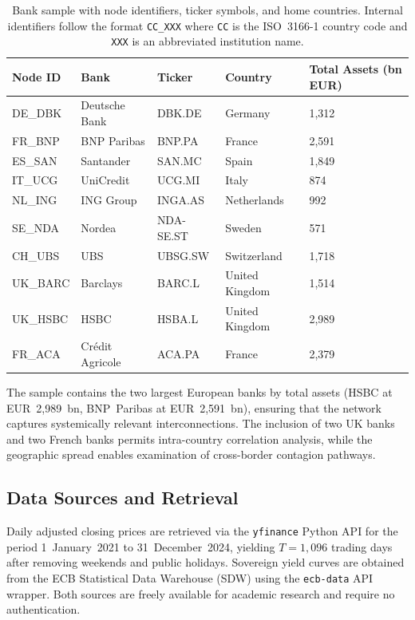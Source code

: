 \begin{table}[H]
\centering
\caption{Bank sample with node identifiers, ticker symbols, and home countries. Internal identifiers follow the format \texttt{CC\_XXX} where \texttt{CC} is the ISO~3166-1 country code and \texttt{XXX} is an abbreviated institution name.}
\label{tab:banks}
\begin{tabular}{lllll}
\toprule
\textbf{Node ID} & \textbf{Bank} & \textbf{Ticker} & \textbf{Country} & \textbf{Total Assets (bn EUR)} \\
\midrule
DE\_DBK  & Deutsche Bank      & DBK.DE    & Germany       & 1,312 \\
FR\_BNP  & BNP Paribas        & BNP.PA    & France        & 2,591 \\
ES\_SAN  & Santander          & SAN.MC    & Spain         & 1,849 \\
IT\_UCG  & UniCredit          & UCG.MI    & Italy         & 874 \\
NL\_ING  & ING Group          & INGA.AS   & Netherlands   & 992 \\
SE\_NDA  & Nordea             & NDA-SE.ST & Sweden        & 571 \\
CH\_UBS  & UBS                & UBSG.SW   & Switzerland   & 1,718 \\
UK\_BARC & Barclays           & BARC.L    & United Kingdom & 1,514 \\
UK\_HSBC & HSBC               & HSBA.L    & United Kingdom & 2,989 \\
FR\_ACA  & Cr\'{e}dit Agricole & ACA.PA   & France        & 2,379 \\
\bottomrule
\end{tabular}
\end{table}

The sample contains the two largest European banks by total assets (HSBC at EUR~2,989~bn, BNP~Paribas at EUR~2,591~bn), ensuring that the network captures systemically relevant interconnections. The inclusion of two UK banks and two French banks permits intra-country correlation analysis, while the geographic spread enables examination of cross-border contagion pathways.

\subsection{Data Sources and Retrieval}

Daily adjusted closing prices are retrieved via the \texttt{yfinance} Python API for the period 1~January~2021 to 31~December~2024, yielding $T = 1{,}096$ trading days after removing weekends and public holidays. Sovereign yield curves are obtained from the ECB Statistical Data Warehouse (SDW) using the \texttt{ecb-data} API wrapper. Both sources are freely available for academic research and require no authentication.

